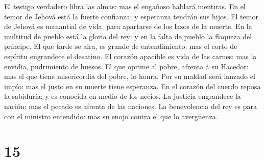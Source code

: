 El testigo verdadero libra las almas: mas el engañoso hablará mentiras.
 En el temor de Jehová está la fuerte confianza; y
esperanza tendrán sus hijos.  El temor de Jehová es
manantial de vida, para apartarse de los lazos de la muerte.
 En la multitud de pueblo está la gloria del rey: y en la
falta de pueblo la flaqueza del príncipe.  El que tarde
se aira, es grande de entendimiento: mas el corto de espíritu engrandece
el desatino.  El corazón apacible es vida de las carnes:
mas la envidia, pudrimiento de huesos.  El que oprime al
pobre, afrenta á su Hacedor: mas el que tiene misericordia del pobre, lo
honra.  Por su maldad será lanzado el impío: mas el justo
en su muerte tiene esperanza.  En el corazón del cuerdo
reposa la sabiduría; y es conocida en medio de los necios.
 La justicia engrandece la nación: mas el pecado es
afrenta de las naciones.  La benevolencia del rey es para
con el ministro entendido: mas su enojo contra el que lo avergüenza.

\hypertarget{section-20-15}{%
\section{15}\label{section-20-15}}


